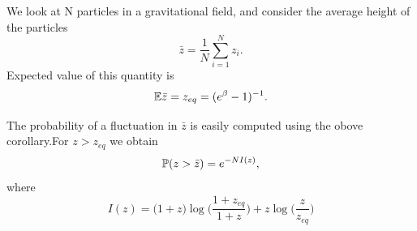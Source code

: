 \documentclass[letterpaper,english,12pt]{article}
\begin{document}
 \begin{exmp}
   We look at N particles in a gravitational field, and consider the average height of the particles 
   \begin{equation}
       \bar{z}= \dfrac{1}{N}\sum_{i=1}^{N}z_i.
    \end{equation}
     Expected value of this quantity  is 
       \begin{equation}
           \E{\bar{z}}= z_{eq}= (e^\beta -1)^{-1}.
           \end{equation}
           
           The probability of a fluctuation in $\bar{z}$ is easily computed using the obove corollary.For $z>z_{eq}$ we obtain 
           \begin{equation}
               \P(z>\bar{z}) = e^{-NI(z)},
           \end{equation}
           where 
           \begin{equation}
               I(z) = \big(1+z\big)\log \big( \dfrac{1+z_{eq}}{1+z}\big) + z\log{\big(\dfrac{z}{z_{eq}}\big)}
           \end{equation}
           
       
   
 \end{exmp}
\end{document}

